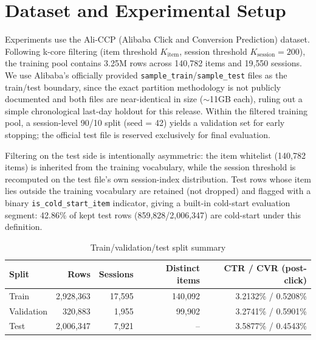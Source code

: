 
\section{Dataset and Experimental Setup}

Experiments use the Ali-CCP (Alibaba Click and Conversion Prediction) dataset. Following k-core filtering (item threshold $K_{\text{item}}$, session threshold $K_{\text{session}}=200$), the training pool contains 3.25M rows across 140{,}782 items and 19{,}550 sessions. We use Alibaba's officially provided \texttt{sample\_train}/\texttt{sample\_test} files as the train/test boundary, since the exact partition methodology is not publicly documented and both files are near-identical in size ($\sim$11GB each), ruling out a simple chronological last-day holdout for this release. Within the filtered training pool, a session-level 90/10 split (seed = 42) yields a validation set for early stopping; the official test file is reserved exclusively for final evaluation.

Filtering on the test side is intentionally asymmetric: the item whitelist (140{,}782 items) is inherited from the training vocabulary, while the session threshold is recomputed on the test file's own session-index distribution. Test rows whose item lies outside the training vocabulary are retained (not dropped) and flagged with a binary \texttt{is\_cold\_start\_item} indicator, giving a built-in cold-start evaluation segment: 42.86\% of kept test rows (859{,}828/2{,}006{,}347) are cold-start under this definition.

\begin{table}[h]
\centering
\caption{Train/validation/test split summary}
\label{tab:split-summary}
\begin{tabular}{lrrrr}
\toprule
Split & Rows & Sessions & Distinct items & CTR / CVR (post-click) \\
\midrule
Train       & 2{,}928{,}363 & 17{,}595 & 140{,}092 & 3.2132\% / 0.5208\% \\
Validation  & 320{,}883     & 1{,}955  & 99{,}902  & 3.2741\% / 0.5901\% \\
Test        & 2{,}006{,}347 & 7{,}921  & --        & 3.5877\% / 0.4543\% \\
\bottomrule
\end{tabular}
\end{table}


